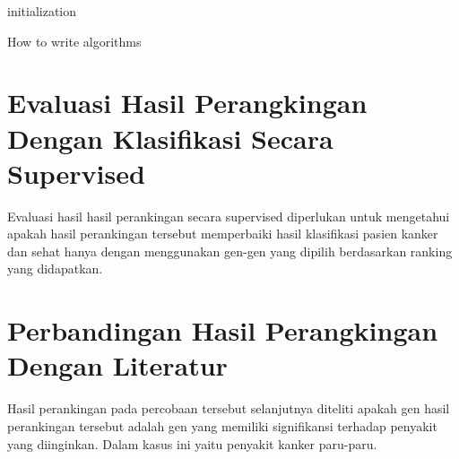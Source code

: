 \begin{algorithm}[H]
 initialization\;
 \caption{How to write algorithms}
\end{algorithm}





\section{Evaluasi Hasil Perangkingan Dengan Klasifikasi Secara Supervised}
Evaluasi hasil hasil perankingan secara supervised diperlukan untuk mengetahui apakah hasil perankingan tersebut memperbaiki hasil klasifikasi pasien kanker dan sehat hanya dengan menggunakan gen-gen yang dipilih berdasarkan ranking yang didapatkan.


\section{Perbandingan Hasil Perangkingan Dengan Literatur}

Hasil perankingan pada percobaan tersebut selanjutnya diteliti apakah gen hasil perankingan tersebut adalah gen yang memiliki signifikansi terhadap penyakit yang diinginkan. Dalam kasus ini yaitu penyakit kanker paru-paru.



